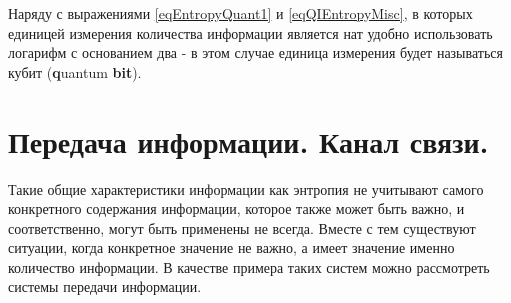 
Наряду с выражениями \eqref{eqEntropyQuant1} и \eqref{eqQIEntropyMisc},
в которых единицей измерения количества информации является нат удобно
использовать логарифм с основанием два - в этом случае единица
измерения будет называться кубит ({\bf q}uantum {\bf bit}).

\section{Передача информации. Канал связи.}

Такие общие характеристики информации как энтропия не учитывают самого
конкретного содержания информации, которое также может быть важно, и
соответственно, могут быть применены не всегда. 
Вместе с тем существуют ситуации, когда конкретное значение не важно,
а имеет значение именно количество информации. В качестве 
примера таких систем можно рассмотреть системы передачи информации.




